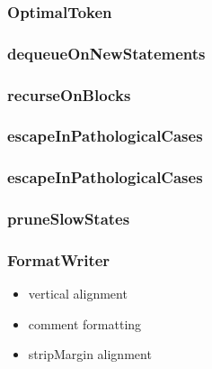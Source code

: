 \subsubsection{OptimalToken}\label{sec:optimal}
\subsubsection{dequeueOnNewStatements}
\subsubsection{recurseOnBlocks}
\subsubsection{escapeInPathologicalCases}
\subsubsection{escapeInPathologicalCases}
\subsubsection{pruneSlowStates}
\subsubsection{FormatWriter}
\begin{itemize}
  \item vertical alignment
  \item comment formatting
  \item stripMargin alignment
\end{itemize}
